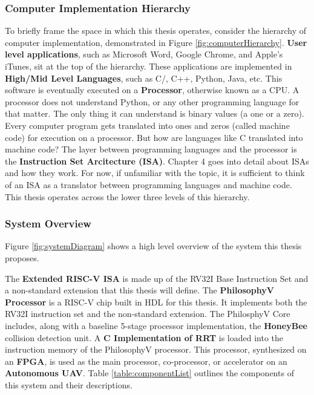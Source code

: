     \newpage
    \subsubsection{Computer Implementation Hierarchy}
        To briefly frame the space in which this thesis operates, consider the hierarchy of computer implementation, demonstrated in Figure \ref{fig:computerHierarchy}. \textbf{User level applications}, such as Microsoft Word, Google Chrome, and Apple's iTunes, sit at the top of the hierarchy. These applications are implemented in \textbf{High/Mid Level Languages}, such as C/, C++, Python, Java, etc. 
        This software is eventually executed on a \textbf{Processor}, otherwise known as a \gls{CPU}. A processor does not understand Python, or any other programming language for that matter. The only thing it can understand is binary values (a one or a zero). Every computer program gets translated into ones and zeros (called machine code) for execution on a processor. But how are languages like C translated into machine code? The layer between programming languages and the processor is the \textbf{Instruction Set Arcitecture (ISA)}. Chapter 4 goes into detail about \gls{ISA}s and how they work. For now, if unfamiliar with the topic, it is sufficient to think of an \gls{ISA} as a translator between programming languages and machine code. This thesis operates across the lower three levels of this hierarchy.
        
        


    \subsubsection{System Overview}
        Figure \ref{fig:systemDiagram} shows a high level overview of the system this thesis proposes.
        
        The \textbf{Extended RISC-V \gls{ISA}} is made up of the \gls{RV32I} Base Instruction Set and a  non-standard extension that this thesis will define.
        The \textbf{PhilosophyV Processor} is a RISC-V chip built in \gls{HDL} for this thesis. It implements both the \gls{RV32I} instruction set and the non-standard extension.
        The PhilosphyV Core includes, along with a baseline 5-stage processor implementation, the \textbf{HoneyBee} collision detection unit.
        A \textbf{C Implementation of RRT} is loaded into the instruction memory of the PhilosophyV processor. This processor, synthesized on an \textbf{\gls{FPGA}}, is used as the main processor, co-processor, or accelerator on an \textbf{Autonomous \gls{UAV}}. Table \ref{table:componentList} outlines the components of this system and their descriptions.
        

